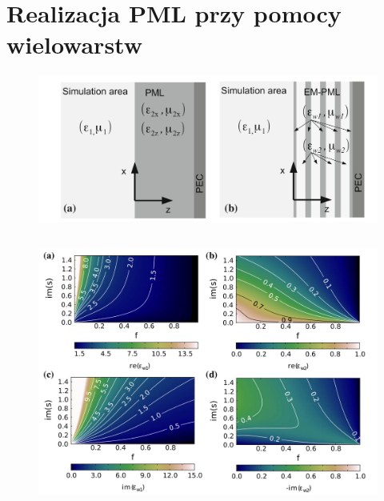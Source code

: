 \documentclass{beamer}
\begin{document}
\section{Realizacja PML przy pomocy wielowarstw}
\begin{frame}
	\begin{figure}
				\includegraphics[width=\textwidth]{../images/pml/oqe_schemat.png}
			\end{figure}

	\begin{columns}
		\begin{column}{0.5\textwidth}

		\end{column}
		\begin{column}{0.5\textwidth}

		\end{column}
	\end{columns}
		
\end{frame}

\begin{frame}
	\begin{figure}
				\includegraphics[width=\textwidth]{../images/pml/oqe_materials.png}
	\end{figure}
		
\end{frame}
\end{document}
